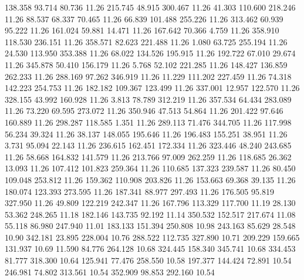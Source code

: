  138.358   93.714   80.736        11.26
 215.745   48.915  300.467        11.26
  41.303  110.600  218.246        11.26
  88.537   68.337   70.465        11.26
  66.839  101.488  255.226        11.26
 313.462   60.939   95.222        11.26
 161.024   59.881   14.471        11.26
 167.642   70.366    4.759        11.26
 358.910  118.530  236.151        11.26
 358.571   82.623  221.488        11.26
   1.080   63.725  255.194        11.26
  24.530  113.950  353.388        11.26
  68.022  134.526  195.915        11.26
 192.722   67.010   29.674        11.26
 345.878   50.410  156.179        11.26
   5.768   52.102  221.285        11.26
 148.427  136.859  262.233        11.26
 288.169   97.262  346.919        11.26
  11.229  111.202  227.459        11.26
  74.318  142.223  254.753        11.26
 182.182  109.367  123.499        11.26
 337.001   12.957  122.570        11.26
 328.155   43.992  160.928        11.26
   3.813   78.789  312.219        11.26
 357.534   64.434  283.089        11.26
  73.220   69.595  273.072        11.26
 350.946   47.513   54.864        11.26
 201.422   97.646  160.889        11.26
 298.287  118.585    1.351        11.26
 289.113   71.476  344.705        11.26
 117.998   56.234   39.324        11.26
  38.137  148.055  195.646        11.26
 196.483  155.251   38.951        11.26
   3.731   95.094   22.143        11.26
 236.615  162.451  172.334        11.26
 323.446   48.240  243.685        11.26
  58.668  164.832  141.579        11.26
 213.766   97.009  262.259        11.26
 118.685   26.362   13.093        11.26
 107.412  101.823  259.364        11.26
 110.685  137.323  239.587        11.26
  80.450  109.048  253.812        11.26
 159.362  110.908  203.826        11.26
 153.663   69.368   39.135        11.26
 180.074  123.393  273.595        11.26
 187.341   88.977  297.493        11.26
 176.505   95.819  327.950        11.26
  49.809  122.219  242.347        11.26
 167.796  113.329  117.700        11.19
  28.130   53.362  248.265        11.18
 182.146  143.735   92.192        11.14
 350.532  152.517  217.674        11.08
  55.118   86.980  247.940        11.01
 183.133  151.394  250.808        10.98
 243.163   85.629   28.548        10.90
 342.181   23.895  228.004        10.76
 288.522  112.735  327.890        10.71
 209.229  159.665  131.937        10.69
  11.590   84.776  264.128        10.68
 324.445  158.340  345.741        10.68
 334.453   81.777  318.300        10.64
 125.941   77.476  258.550        10.58
 197.377  144.424   72.891        10.54
 246.981   74.802  313.561        10.54
 352.909   98.853  292.160        10.54
